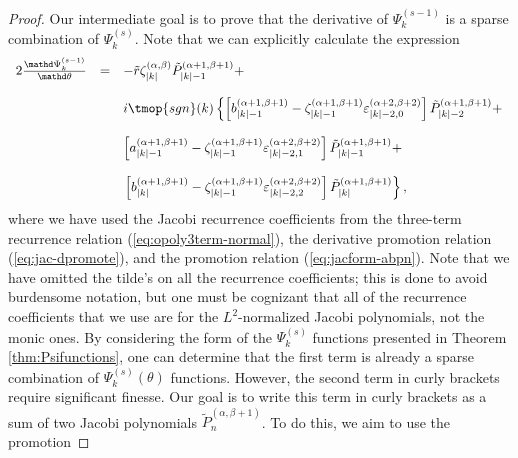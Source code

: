 \begin{proof}
  Our intermediate goal is to prove that the derivative of $\Psi_k^{(s - 1)}$
  is a sparse combination of $\Psi_k^{(s)}$. Note that we can explicitly
  calculate the expression
  \begin{equation}
    \label{eq:stiffproof1} \begin{array}{lll}
      2 \frac{\mathd \Psi_k^{(s - 1)}}{\mathd \theta} & = & - \tilde{r}
      \zeta_{|k|}^{(\alpha, \beta)}  \tilde{P}_{|k| - 1}^{(\alpha + 1, \beta +
      1)} +\\
      &  & \\
      &  & i \tmop{sgn} (k) \left\{ \left[ b_{|k| - 1}^{(\alpha + 1, \beta +
      1)} - \zeta_{|k| - 1}^{(\alpha + 1, \beta + 1)} \varepsilon_{|k| - 2,
      0}^{(\alpha + 2, \beta + 2)}  \right]  \tilde{P}_{|k| - 2}^{(\alpha + 1,
      \beta + 1)} + \right.\\
      &  & \\
      &  & \left[ a_{|k| - 1}^{(\alpha + 1, \beta + 1)} - \zeta_{|k| -
      1}^{(\alpha + 1, \beta + 1)} \varepsilon_{|k| - 2, 1}^{(\alpha + 2,
      \beta + 2)}  \right]  \tilde{P}_{|k| - 1}^{(\alpha + 1, \beta + 1)} +\\
      &  & \\
      &  & \left. \left[ b_{|k|}^{(\alpha + 1, \beta + 1)} - \zeta_{|k| -
      1}^{(\alpha + 1, \beta + 1)} \varepsilon_{|k| - 2, 2}^{(\alpha + 2,
      \beta + 2)}  \right]  \tilde{P}_{|k|}^{(\alpha + 1, \beta + 1)}
      \right\},
    \end{array}
  \end{equation}
  where we have used the Jacobi recurrence coefficients from the three-term
  recurrence relation (\ref{eq:opoly3term-normal}), the derivative promotion
  relation (\ref{eq:jac-dpromote}), and the promotion relation
  (\ref{eq:jacform-abpn}). Note that we have omitted the tilde's on all the
  recurrence coefficients; this is done to avoid burdensome notation, but one
  must be cognizant that all of the recurrence coefficients that we use are
  for the $L^2$-normalized Jacobi polynomials, not the monic ones. By
  considering the form of the $\Psi_k^{(s)}$ functions presented in Theorem
  \ref{thm:Psifunctions}, one can determine that the first term is already a
  sparse combination of $\Psi_k^{(s)} (\theta)$ functions. However, the second
  term in curly brackets require significant finesse. Our goal is to write
  this term in curly brackets as a sum of two Jacobi polynomials
  $\tilde{P}_n^{(\alpha, \beta + 1)}$. To do this, we aim to use the promotion

\end{proof}
